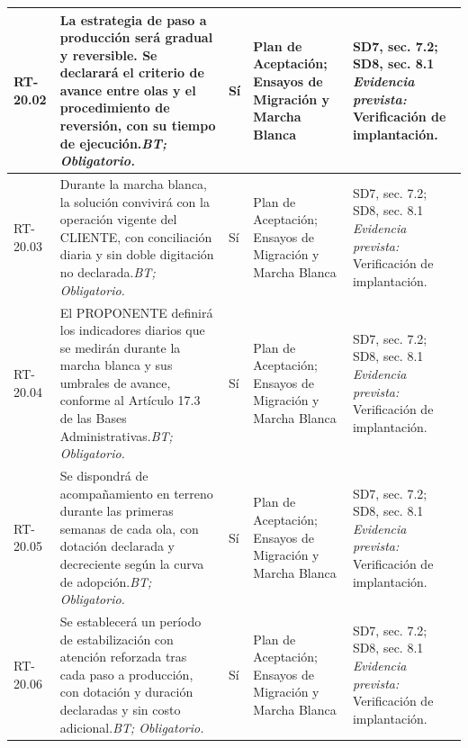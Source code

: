 \begin{paginaHorizontalSynaptix}
\begin{longtable}{|L{0.09\AnchoMatrizTDoce}|L{0.385\AnchoMatrizTDoce}|L{0.065\AnchoMatrizTDoce}|L{0.18\AnchoMatrizTDoce}|L{0.28\AnchoMatrizTDoce}|}
RT-\allowbreak{}20.\allowbreak{}02 &
La estrategia de paso a producción será gradual y reversible. Se declarará el criterio de avance entre olas y el procedimiento de reversión, con su tiempo de ejecución.\newline\textit{BT; Obligatorio.} &
Sí &
Plan de Aceptación; Ensayos de Migración y Marcha Blanca &
SD7, sec. 7.2; SD8, sec. 8.1 \newline\textit{Evidencia prevista:} Verificación de implantación. \\ \hline

RT-\allowbreak{}20.\allowbreak{}03 &
Durante la marcha blanca, la solución convivirá con la operación vigente del CLIENTE, con conciliación diaria y sin doble digitación no declarada.\newline\textit{BT; Obligatorio.} &
Sí &
Plan de Aceptación; Ensayos de Migración y Marcha Blanca &
SD7, sec. 7.2; SD8, sec. 8.1 \newline\textit{Evidencia prevista:} Verificación de implantación. \\ \hline

RT-\allowbreak{}20.\allowbreak{}04 &
El PROPONENTE definirá los indicadores diarios que se medirán durante la marcha blanca y sus umbrales de avance, conforme al Artículo 17.3 de las Bases Administrativas.\newline\textit{BT; Obligatorio.} &
Sí &
Plan de Aceptación; Ensayos de Migración y Marcha Blanca &
SD7, sec. 7.2; SD8, sec. 8.1 \newline\textit{Evidencia prevista:} Verificación de implantación. \\ \hline

RT-\allowbreak{}20.\allowbreak{}05 &
Se dispondrá de acompañamiento en terreno durante las primeras semanas de cada ola, con dotación declarada y decreciente según la curva de adopción.\newline\textit{BT; Obligatorio.} &
Sí &
Plan de Aceptación; Ensayos de Migración y Marcha Blanca &
SD7, sec. 7.2; SD8, sec. 8.1 \newline\textit{Evidencia prevista:} Verificación de implantación. \\ \hline

RT-\allowbreak{}20.\allowbreak{}06 &
Se establecerá un período de estabilización con atención reforzada tras cada paso a producción, con dotación y duración declaradas y sin costo adicional.\newline\textit{BT; Obligatorio.} &
Sí &
Plan de Aceptación; Ensayos de Migración y Marcha Blanca &
SD7, sec. 7.2; SD8, sec. 8.1 \newline\textit{Evidencia prevista:} Verificación de implantación. \\ \hline


\end{longtable}
\end{paginaHorizontalSynaptix}
